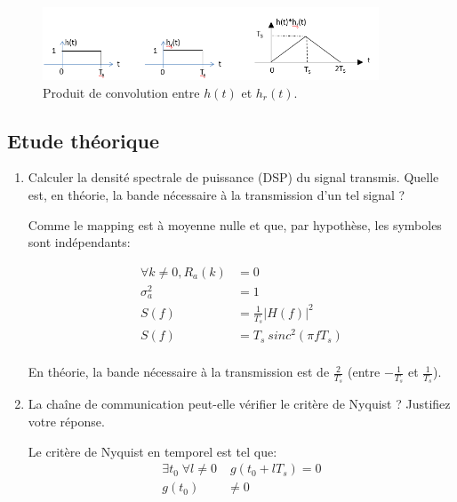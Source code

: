\documentclass[frenchb]{article}
\begin{document}
\begin{figure}[ht!]
\centering
\includegraphics[width=10cm]{figure2.png}
\caption{Produit de convolution entre $h(t)$ et $h_r(t)$.\label{fig : prod_conv1}}
\end{figure}

\newpage
\subsection{Etude théorique}

    \begin{enumerate}
        \item Calculer la densité spectrale de puissance (DSP) du signal transmis. Quelle est, en théorie, la bande nécessaire à la transmission d'un tel signal ?
        \par\leavevmode\par
        \setlength\parindent{0.5cm}
        Comme le mapping est à moyenne nulle et que, par hypothèse, les symboles sont indépendants:
        
        \begin{equation*}
        \begin{split}
        \forall k \ne 0, R_a(k) &= 0 \\
        \sigma_a^2 &= 1 \\
        S(f) &= \frac{1}{T_s} |H(f)|^2 \\
        S(f) & = T_s \ sinc^2(\pi f T_s) \\
        \end{split}
        \end{equation*}
        
        En théorie, la bande nécessaire à la transmission est de $\frac{2}{T_s}$ (entre $- \frac{1}{T_s}$ et $\frac{1}{T_s}$). 
        
        \item La chaîne de communication peut-elle vérifier le critère de Nyquist ? Justifiez votre réponse.
        \par\leavevmode\par
        \setlength\parindent{0.5cm}
        Le critère de Nyquist en temporel est tel que: 
        \begin{equation*}
        \begin{split}
        \exists t_0 \; \forall l \ne 0 & \; g(t_0 + l T_s) = 0 \\   
        g(t_0) & \ne 0 \\
        \end{split}
        \end{equation*}
        

\end{enumerate}
\end{document}
